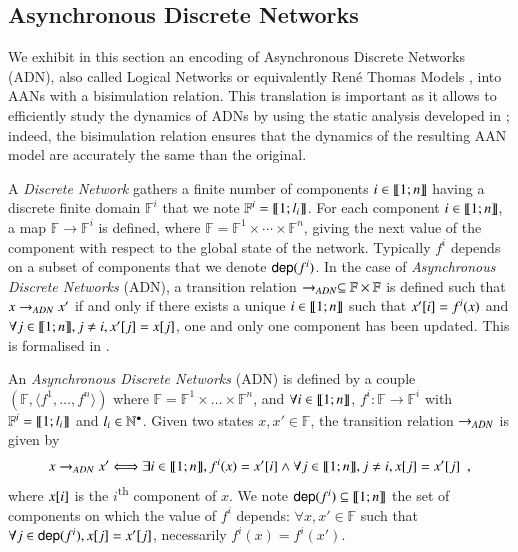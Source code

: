 \subsection{Asynchronous Discrete Networks}
\label{sec:dn}

We exhibit in this section an encoding of Asynchronous Discrete Networks (ADN),
also called Logical Networks or equivalently René Thomas Models \cite{Thomas95,deJong02},
into AANs with a bisimulation relation.
This translation is important as it allows to efficiently study the dynamics of ADNs
by using the static analysis developed in ;
indeed, the bisimulation relation ensures that the dynamics of the
resulting AAN model are accurately the same than the original.

A \emph{Discrete Network} gathers a finite number of components $i\in\llbracket 1; n \rrbracket$ having a discrete finite domain
$\mathbb F^i$ that we note $\mathbb{F}^i = \llbracket 1; l_i \rrbracket$.
For each component $i\in\llbracket 1; n \rrbracket$, a map $\mathbb F \rightarrow \mathbb F^i$ is defined, where
$\mathbb F = \mathbb F^1 \times \cdots \times \mathbb F^n$, giving the next value of the component
with respect to the global state of the network.
Typically $f^i$ depends on a subset of components that we denote $\mathsf{dep}(f^i)$.
In the case of \emph{Asynchronous Discrete Networks} (ADN), a transition relation $\rightarrow_{ADN}\subseteq \mathbb
F\times \mathbb F$ is defined such that $x\rightarrow_{ADN} x'$ if and only if there exists a unique
$i\in\llbracket 1; n \rrbracket$ such that $x'[{i}]=f^i(x)$ and $\forall j\in\llbracket 1; n \rrbracket, j\neq i, x'[{j}]
=x[{j}]$, \ie one and only one component has been updated.
This is formalised in .

\begin{definition}
\label{def:DN}
  An \emph{Asynchronous Discrete Networks} (ADN) is defined by a couple $(\mathbb F, \langle f^1, \dots, f^n \rangle)$
  where $\mathbb{F} = \mathbb{F}^1\times\dots\times\mathbb{F}^n$,
  and $\forall i\in\llbracket 1; n \rrbracket$,
  $f^i: \mathbb{F} \rightarrow \mathbb{F}^i$ with
  $\mathbb{F}^i = \llbracket 1; l_i \rrbracket$ and $l_i \in \mathbb{N}^\bullet$.
  Given two states $x,x'\in\mathbb F$, the transition relation $\rightarrow_{ADN}$ is given by
  \[
  x\rightarrow_{ADN} x' \Longleftrightarrow
    \exists i\in\llbracket 1; n \rrbracket, f^i(x)=x'[{i}]
    \wedge \forall j\in\llbracket 1; n \rrbracket, j\neq i, x[{j}]=x'[{j}]
  \enspace,
  \]
  where $x[{i}]$ is the $i$\textsuperscript{th} component of $x$.
  We note $\mathsf{dep}(f^i)\subseteq \llbracket 1; n \rrbracket$ the set of components on which the value of $f^i$
  depends: $\forall x,x'\in \mathbb F$ such that $\forall
  j\in\mathsf{dep}(f^i), x[{j}]=x'[{j}]$, necessarily $f^i(x)=f^i(x')$.
\end{definition}

